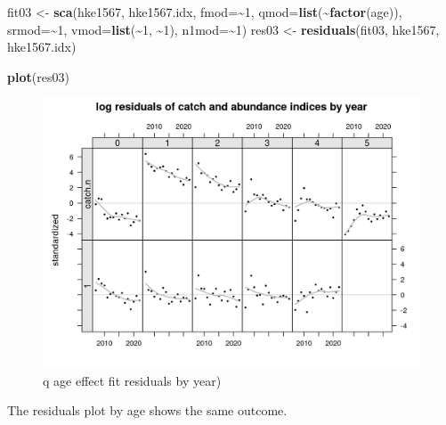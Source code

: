 \documentclass[
]{book}
\newenvironment{Shaded}{\begin{snugshade}}{\end{snugshade}}
\newcommand{\AttributeTok}[1]{\textcolor[rgb]{0.13,0.29,0.53}{#1}}
\newcommand{\DecValTok}[1]{\textcolor[rgb]{0.00,0.00,0.81}{#1}}
\newcommand{\FunctionTok}[1]{\textcolor[rgb]{0.13,0.29,0.53}{\textbf{#1}}}
\newcommand{\NormalTok}[1]{#1}
\newcommand{\OtherTok}[1]{\textcolor[rgb]{0.56,0.35,0.01}{#1}}
\newcommand{\SpecialCharTok}[1]{\textcolor[rgb]{0.81,0.36,0.00}{\textbf{#1}}}
\begin{document}
\begin{Shaded}
\begin{Highlighting}[]
\NormalTok{fit03 }\OtherTok{\textless{}{-}} \FunctionTok{sca}\NormalTok{(hke1567, hke1567.idx, }\AttributeTok{fmod=}\SpecialCharTok{\textasciitilde{}}\DecValTok{1}\NormalTok{, }\AttributeTok{qmod=}\FunctionTok{list}\NormalTok{(}\SpecialCharTok{\textasciitilde{}}\FunctionTok{factor}\NormalTok{(age)), }\AttributeTok{srmod=}\SpecialCharTok{\textasciitilde{}}\DecValTok{1}\NormalTok{, }\AttributeTok{vmod=}\FunctionTok{list}\NormalTok{(}\SpecialCharTok{\textasciitilde{}}\DecValTok{1}\NormalTok{, }\SpecialCharTok{\textasciitilde{}}\DecValTok{1}\NormalTok{),  }\AttributeTok{n1mod=}\SpecialCharTok{\textasciitilde{}}\DecValTok{1}\NormalTok{)}
\NormalTok{res03 }\OtherTok{\textless{}{-}} \FunctionTok{residuals}\NormalTok{(fit03, hke1567, hke1567.idx)}
\end{Highlighting}
\end{Shaded}

\begin{Shaded}
\begin{Highlighting}[]
\FunctionTok{plot}\NormalTok{(res03)}
\end{Highlighting}
\end{Shaded}

\begin{figure}
\centering
\includegraphics{_bookdown_files/_main_files/figure-html/qageresbyyear-1.png}
\caption{\label{fig:qageresbyyear}q age effect fit residuals by year)}
\end{figure}

The residuals plot by age shows the same outcome.
\end{document}
